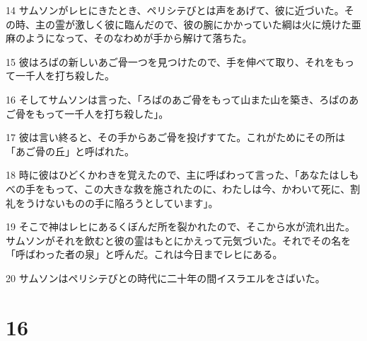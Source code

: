 \par 14 サムソンがレヒにきたとき、ペリシテびとは声をあげて、彼に近づいた。その時、主の霊が激しく彼に臨んだので、彼の腕にかかっていた綱は火に焼けた亜麻のようになって、そのなわめが手から解けて落ちた。
\par 15 彼はろばの新しいあご骨一つを見つけたので、手を伸べて取り、それをもって一千人を打ち殺した。
\par 16 そしてサムソンは言った、「ろばのあご骨をもって山また山を築き、ろばのあご骨をもって一千人を打ち殺した」。
\par 17 彼は言い終ると、その手からあご骨を投げすてた。これがためにその所は「あご骨の丘」と呼ばれた。
\par 18 時に彼はひどくかわきを覚えたので、主に呼ばわって言った、「あなたはしもべの手をもって、この大きな救を施されたのに、わたしは今、かわいて死に、割礼をうけないものの手に陥ろうとしています」。
\par 19 そこで神はレヒにあるくぼんだ所を裂かれたので、そこから水が流れ出た。サムソンがそれを飲むと彼の霊はもとにかえって元気づいた。それでその名を「呼ばわった者の泉」と呼んだ。これは今日までレヒにある。
\par 20 サムソンはペリシテびとの時代に二十年の間イスラエルをさばいた。

\chapter{16}

